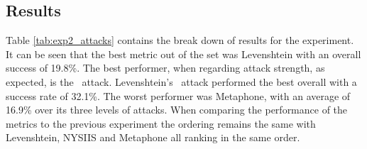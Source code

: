 \subsection*{Results}
Table \ref{tab:exp2_attacks} contains the break down of results for the experiment. It can be seen that the best metric out of the set was Levenshtein with an overall success of 19.8\%. The best performer, when regarding attack strength, as expected, is the \XOOX~attack. Levenshtein's \XOOX~attack performed the best overall with a success rate of 32.1\%. The worst performer was Metaphone, with an average of 16.9\% over its three levels of attacks. When comparing the performance of the metrics to the previous experiment the ordering remains the same with Levenshtein, NYSIIS and Metaphone all ranking in the same order.

\begin{table}
    \caption{Success rates for simulated attacks}
    \label{tab:exp2_attacks}
\end{table}

